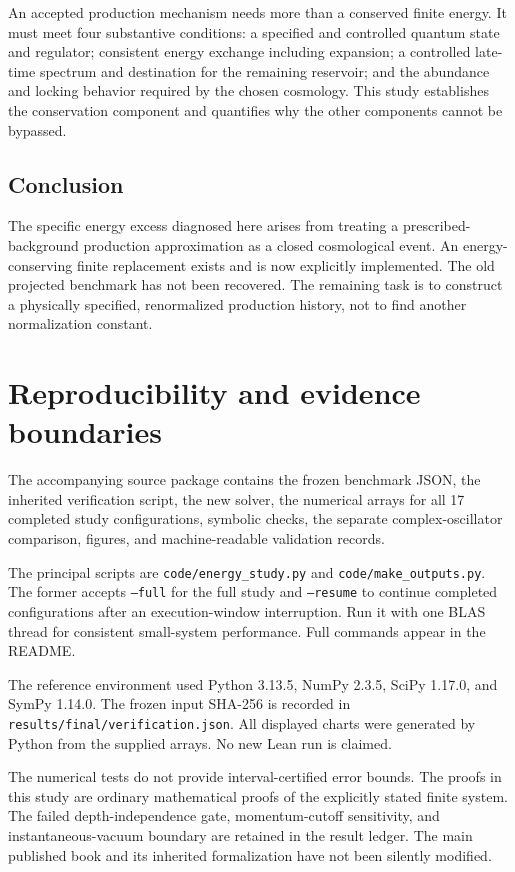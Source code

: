 \documentclass[11pt]{article}
\theoremstyle{definition}\newtheorem{definition}[theorem]{Definition}
\begin{document}
An accepted production mechanism needs more than a conserved finite energy. It must meet four substantive conditions: a specified and controlled quantum state and regulator; consistent energy exchange including expansion; a controlled late-time spectrum and destination for the remaining reservoir; and the abundance and locking behavior required by the chosen cosmology. This study establishes the conservation component and quantifies why the other components cannot be bypassed.

\subsection*{Conclusion}
The specific energy excess diagnosed here arises from treating a prescribed-background production approximation as a closed cosmological event. An energy-conserving finite replacement exists and is now explicitly implemented. The old projected benchmark has not been recovered. The remaining task is to construct a physically specified, renormalized production history, not to find another normalization constant.

\clearpage
\appendix
\section{Reproducibility and evidence boundaries}
The accompanying source package contains the frozen benchmark JSON, the inherited verification script, the new solver, the numerical arrays for all 17 completed study configurations, symbolic checks, the separate complex-oscillator comparison, figures, and machine-readable validation records.

The principal scripts are \texttt{code/energy\_study.py} and \texttt{code/make\_outputs.py}. The former accepts \texttt{--full} for the full study and \texttt{--resume} to continue completed configurations after an execution-window interruption. Run it with one BLAS thread for consistent small-system performance. Full commands appear in the README.

The reference environment used Python 3.13.5, NumPy 2.3.5, SciPy 1.17.0, and SymPy 1.14.0. The frozen input SHA-256 is recorded in \texttt{results/final/verification.json}. All displayed charts were generated by Python from the supplied arrays. No new Lean run is claimed.

The numerical tests do not provide interval-certified error bounds. The proofs in this study are ordinary mathematical proofs of the explicitly stated finite system. The failed depth-independence gate, momentum-cutoff sensitivity, and instantaneous-vacuum boundary are retained in the result ledger. The main published book and its inherited formalization have not been silently modified.
\end{document}
